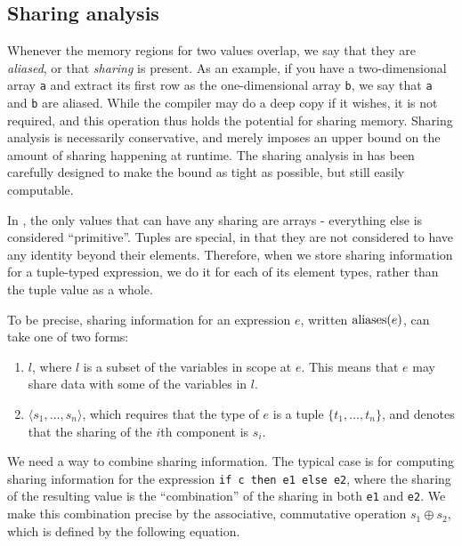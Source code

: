 \subsection{Sharing analysis}
\label{sec:l0-sharing}

Whenever the memory regions for two values overlap, we say that they
are \textit{aliased}, or that \textit{sharing} is present.  As an
example, if you have a two-dimensional array \texttt{a} and extract
its first row as the one-dimensional array \texttt{b}, we say that
\texttt{a} and \texttt{b} are aliased.  While the \LO{} compiler may
do a deep copy if it wishes, it is not required, and this operation
thus holds the potential for sharing memory.  Sharing analysis is
necessarily conservative, and merely imposes an upper bound on the
amount of sharing happening at runtime.  The sharing analysis in \LO{}
has been carefully designed to make the bound as tight as possible,
but still easily computable.

In \LO{}, the only values that can have any sharing are arrays -
everything else is considered ``primitive''.  Tuples are special, in
that they are not considered to have any identity beyond their
elements.  Therefore, when we store sharing information for a
tuple-typed expression, we do it for each of its element types, rather
than the tuple value as a whole.

To be precise, sharing information for an expression $e$, written
$\textrm{aliases}(e)$, can take one of two forms:

\begin{enumerate}
\item $l$, where $l$ is a subset of the variables in scope at $e$.
  This means that $e$ may share data with some of the variables in
  $l$.

\item $\langle s_{1}, \ldots, s_{n} \rangle$, which requires that the
  type of $e$ is a tuple $\{t_{1}, \ldots, t_{n}\}$, and denotes that
  the sharing of the $i$th component is $s_{i}$.
\end{enumerate}

We need a way to combine sharing information.  The typical case is for
computing sharing information for the expression \texttt{if c then e1
  else e2}, where the sharing of the resulting value is the
``combination'' of the sharing in both \texttt{e1} and \texttt{e2}.
We make this combination precise by the associative, commutative
operation $s_{1} \oplus s_{2}$, which is defined by the following
equation.

